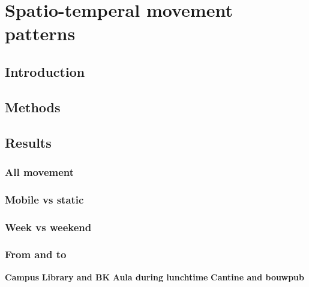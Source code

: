\chapter{Spatio-temperal movement patterns}\label{hernoemen}
\section{Introduction}
\section{Methods}

\section{Results}\label{results}
\subsection{All movement}
\subsection{Mobile vs static}
\subsection{Week vs weekend}
\subsection{From and to}
\textbf{Campus}
\textbf{Library and BK}
\textbf{Aula during lunchtime}
\textbf{Cantine and bouwpub}